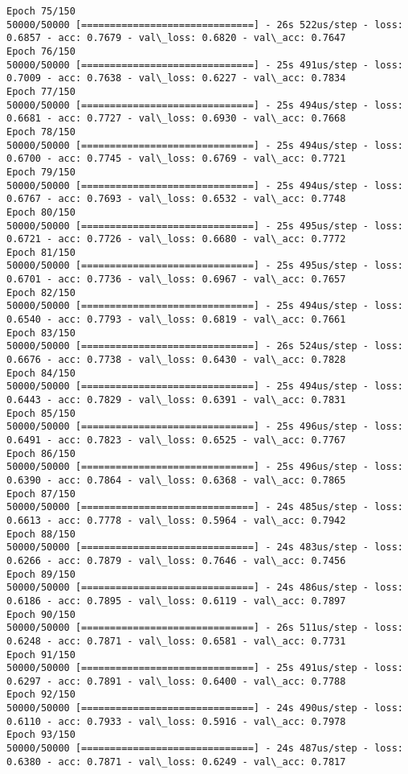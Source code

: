 \documentclass[11pt]{article}
\begin{document}
\begin{Verbatim}[commandchars=\\\{\}]
Epoch 75/150
50000/50000 [==============================] - 26s 522us/step - loss: 0.6857 - acc: 0.7679 - val\_loss: 0.6820 - val\_acc: 0.7647
Epoch 76/150
50000/50000 [==============================] - 25s 491us/step - loss: 0.7009 - acc: 0.7638 - val\_loss: 0.6227 - val\_acc: 0.7834
Epoch 77/150
50000/50000 [==============================] - 25s 494us/step - loss: 0.6681 - acc: 0.7727 - val\_loss: 0.6930 - val\_acc: 0.7668
Epoch 78/150
50000/50000 [==============================] - 25s 494us/step - loss: 0.6700 - acc: 0.7745 - val\_loss: 0.6769 - val\_acc: 0.7721
Epoch 79/150
50000/50000 [==============================] - 25s 494us/step - loss: 0.6767 - acc: 0.7693 - val\_loss: 0.6532 - val\_acc: 0.7748
Epoch 80/150
50000/50000 [==============================] - 25s 495us/step - loss: 0.6721 - acc: 0.7726 - val\_loss: 0.6680 - val\_acc: 0.7772
Epoch 81/150
50000/50000 [==============================] - 25s 495us/step - loss: 0.6701 - acc: 0.7736 - val\_loss: 0.6967 - val\_acc: 0.7657
Epoch 82/150
50000/50000 [==============================] - 25s 494us/step - loss: 0.6540 - acc: 0.7793 - val\_loss: 0.6819 - val\_acc: 0.7661
Epoch 83/150
50000/50000 [==============================] - 26s 524us/step - loss: 0.6676 - acc: 0.7738 - val\_loss: 0.6430 - val\_acc: 0.7828
Epoch 84/150
50000/50000 [==============================] - 25s 494us/step - loss: 0.6443 - acc: 0.7829 - val\_loss: 0.6391 - val\_acc: 0.7831
Epoch 85/150
50000/50000 [==============================] - 25s 496us/step - loss: 0.6491 - acc: 0.7823 - val\_loss: 0.6525 - val\_acc: 0.7767
Epoch 86/150
50000/50000 [==============================] - 25s 496us/step - loss: 0.6390 - acc: 0.7864 - val\_loss: 0.6368 - val\_acc: 0.7865
Epoch 87/150
50000/50000 [==============================] - 24s 485us/step - loss: 0.6613 - acc: 0.7778 - val\_loss: 0.5964 - val\_acc: 0.7942
Epoch 88/150
50000/50000 [==============================] - 24s 483us/step - loss: 0.6266 - acc: 0.7879 - val\_loss: 0.7646 - val\_acc: 0.7456
Epoch 89/150
50000/50000 [==============================] - 24s 486us/step - loss: 0.6186 - acc: 0.7895 - val\_loss: 0.6119 - val\_acc: 0.7897
Epoch 90/150
50000/50000 [==============================] - 26s 511us/step - loss: 0.6248 - acc: 0.7871 - val\_loss: 0.6581 - val\_acc: 0.7731
Epoch 91/150
50000/50000 [==============================] - 25s 491us/step - loss: 0.6297 - acc: 0.7891 - val\_loss: 0.6400 - val\_acc: 0.7788
Epoch 92/150
50000/50000 [==============================] - 24s 490us/step - loss: 0.6110 - acc: 0.7933 - val\_loss: 0.5916 - val\_acc: 0.7978
Epoch 93/150
50000/50000 [==============================] - 24s 487us/step - loss: 0.6380 - acc: 0.7871 - val\_loss: 0.6249 - val\_acc: 0.7817

\end{Verbatim}
\end{document}
